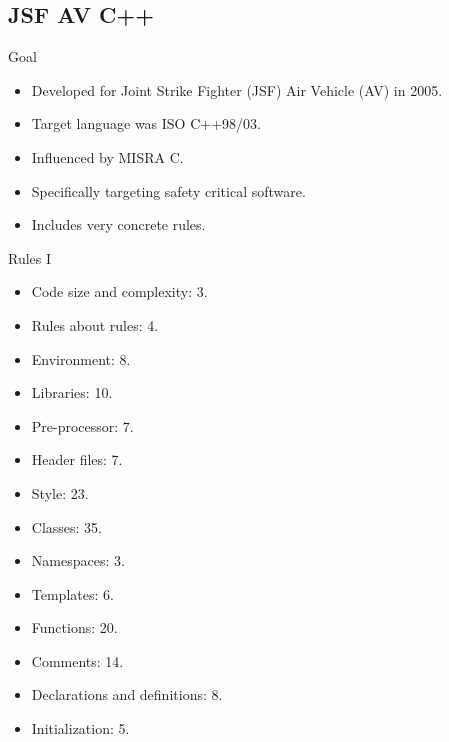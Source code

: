 \subsection{JSF AV C++}

\begin{frame}[t]{Goal}
\begin{itemize}
  \item Developed for Joint Strike Fighter (JSF) Air Vehicle (AV) in 2005.

  \vfill
  \item Target language was ISO C++98/03.

  \vfill
  \item Influenced by MISRA C.

  \vfill
  \item Specifically targeting safety critical software.

  \vfill
  \item Includes very concrete rules.
\end{itemize}
\end{frame}

\begin{frame}[t,shrink]{Rules I}
\begin{itemize}
  \item Code size and complexity: 3.
  \item Rules about rules: 4.
  \item Environment: 8.
  \item Libraries: 10.
  \item Pre-processor: 7.
  \item Header files: 7.
  \item Style: 23.
  \item Classes: 35.
  \item Namespaces: 3.
  \item Templates: 6.
  \item Functions: 20.
  \item Comments: 14.
  \item Declarations and definitions: 8.
  \item Initialization: 5.
\end{itemize}
\end{frame}

